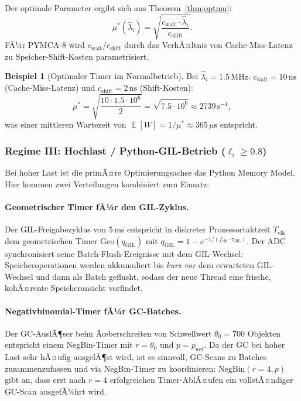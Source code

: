 ﻿\documentclass[a4paper,12pt]{scrreprt}
\theoremstyle{definition}
\newtheorem{beispiel}{Beispiel}[section]
\DeclareMathOperator{\E}{\mathbb{E}}
\newcommand{\Geo}{\mathrm{Geo}}
\newcommand{\NBin}{\mathrm{NegBin}}
\begin{document}
	Der optimale Parameter ergibt sich aus Theorem~\ref{thm:optmu}:
	\begin{equation}
		\mu^*(\hat\lambda_i) = \sqrt{\frac{c_{\mathrm{wait}} \cdot \hat\lambda_i}
			{c_{\mathrm{shift}}}}.
		\label{eq:muopt_concrete}
	\end{equation}
	FÃ¼r PYMCA-8 wird $c_{\mathrm{wait}} / c_{\mathrm{shift}}$ durch das
	VerhÃ¤ltnis von Cache-Miss-Latenz zu Speicher-Shift-Kosten parametrisiert.
	
	\begin{beispiel}[Optimaler Timer im Normalbetrieb]
		Bei $\hat\lambda_i = 1.5\,\mathrm{MHz}$, $c_{\mathrm{wait}} = 10\,\mathrm{ns}$
		(Cache-Miss-Latenz) und $c_{\mathrm{shift}} = 2\,\mathrm{ns}$ (Shift-Kosten):
		\[
		\mu^* = \sqrt{\frac{10 \cdot 1.5 \cdot 10^6}{2}} = \sqrt{7.5 \cdot 10^6}
		\approx 2739\,\mathrm{s}^{-1},
		\]
		was einer mittleren Wartezeit von $\E[W] = 1/\mu^* \approx 365\,\mu\mathrm{s}$
		entspricht.
	\end{beispiel}
	
	\subsubsection{Regime III: Hochlast / Python-GIL-Betrieb ($\ell_i \ge 0.8$)}
	
	Bei hoher Last ist die primÃ¤re Optimierungsachse das Python Memory Model.
	Hier kommen zwei Verteilungen kombiniert zum Einsatz:
	
	\paragraph{Geometrischer Timer fÃ¼r den GIL-Zyklus.}
	Der GIL-Freigabezyklus von $5\,\mathrm{ms}$ entspricht in diskreter
	Prozessortaktzeit $T_{\mathrm{clk}}$ dem geometrischen Timer
	$\Geo(q_{\mathrm{GIL}})$ mit $q_{\mathrm{GIL}} = 1 - e^{-1/(f_{\mathrm{clk}}
		\cdot \tau_{\mathrm{GIL}})}$. Der ADC synchronisiert seine Batch-Flush-Ereignisse
	mit dem GIL-Wechsel: Speicheroperationen werden akkumuliert bis
	\emph{kurz vor} dem erwarteten GIL-Wechsel und dann als Batch geflusht,
	sodass der neue Thread eine frische, kohÃ¤rente Speicheransicht vorfindet.
	
	\paragraph{Negativbinomial-Timer fÃ¼r GC-Batches.}
	Der GC-AuslÃ¶ser beim Ãœberschreiten von Schwellwert $\theta_0 = 700$
	Objekten entspricht einem NegBin-Timer mit $r = \theta_0$ und
	$p = p_{\mathrm{net}}$. Da der GC bei hoher Last sehr hÃ¤ufig
	ausgelÃ¶st wird, ist es sinnvoll, GC-Scans zu Batches zusammenzufassen
	und via NegBin-Timer zu koordinieren: $\NBin(r=4, p)$ gibt an, dass
	erst nach $r=4$ erfolgreichen Timer-AblÃ¤ufen ein vollstÃ¤ndiger
	GC-Scan ausgefÃ¼hrt wird.
	
\end{document}
